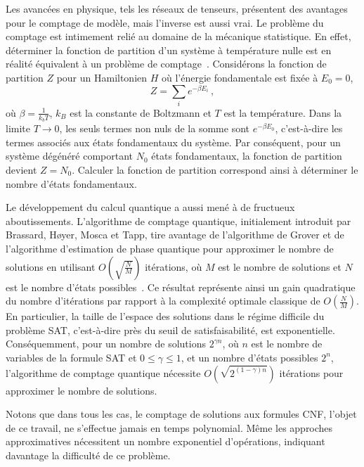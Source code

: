 Les avancées en physique, tels les réseaux de tenseurs, présentent des avantages pour le comptage de modèle, mais l'inverse est aussi vrai. Le problème du comptage est intimement relié au domaine de la mécanique statistique. En effet, déterminer la fonction de partition d'un système à température nulle est en réalité équivalent à un problème de comptage~\cite{timmeCountingComplexDisordered2009}. Considérons la fonction de partition $Z$ pour un Hamiltonien $H$ où l'énergie fondamentale est fixée à $E_{0} = 0$,
\begin{equation}
    Z = \sum_{i} e^{-\beta E_{i}} \,,
\end{equation}
où $\beta = \frac{1}{k_{b} T}$, $k_{B}$ est la constante de Boltzmann et $T$ est la température. Dans la limite $T \to 0$, les seuls termes non nuls de la somme sont $e^{-\beta E_{0}}$, c'est-à-dire les termes associés aux états fondamentaux du système. Par conséquent, pour un système dégénéré comportant $N_{0}$ états fondamentaux, la fonction de partition devient $Z = N_{0}$. Calculer la fonction de partition correspond ainsi à déterminer le nombre d'états fondamentaux.

Le développement du calcul quantique a aussi mené à de fructueux aboutissements. L'algorithme de comptage quantique, initialement introduit par Brassard, H\o yer, Mosca et Tapp, tire avantage de l'algorithme de Grover et de l'algorithme d'estimation de phase quantique pour approximer le nombre de solutions en utilisant $O(\sqrt{\frac{N}{M}})$ itérations, où $M$ est le nombre de solutions et $N$ est le nombre d'états possibles~\cite{brassardQuantumAmplitudeAmplification2002, wieSimplerQuantumCounting2019, aaronsonQuantumApproximateCounting2020}. Ce résultat représente ainsi un gain quadratique du nombre d'itérations par rapport à la complexité optimale classique de $O(\frac{N}{M})$. En particulier, la taille de l'espace des solutions dans le régime difficile du problème SAT, c'est-à-dire près du seuil de satisfaisabilité, est exponentielle. Conséquemment, pour un nombre de solutions $2^{\gamma n}$, où $n$ est le nombre de variables de la formule SAT et $0 \leq \gamma \leq 1$, et un nombre d'états possibles $2^{n}$, l'algorithme de comptage quantique nécessite $O(\sqrt{2^{(1 - \gamma) n }})$ itérations pour approximer le nombre de solutions.

Notons que dans tous les cas, le comptage de solutions aux formules CNF, l'objet de ce travail, ne s'effectue jamais en temps polynomial. Même les approches approximatives nécessitent un nombre exponentiel d'opérations, indiquant davantage la difficulté de ce problème.

